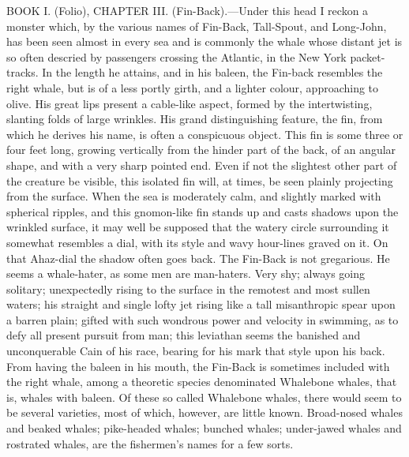 BOOK I. (Folio), CHAPTER III. (Fin-Back).—Under this head I reckon a monster which, by the various names of Fin-Back, Tall-Spout, and Long-John, has been seen almost in every sea and is commonly the whale whose distant jet is so often descried by passengers crossing the Atlantic, in the New York packet-tracks. In the length he attains, and in his baleen, the Fin-back resembles the right whale, but is of a less portly girth, and a lighter colour, approaching to olive. His great lips present a cable-like aspect, formed by the intertwisting, slanting folds of large wrinkles. His grand distinguishing feature, the fin, from which he derives his name, is often a conspicuous object. This fin is some three or four feet long, growing vertically from the hinder part of the back, of an angular shape, and with a very sharp pointed end. Even if not the slightest other part of the creature be visible, this isolated fin will, at times, be seen plainly projecting from the surface. When the sea is moderately calm, and slightly marked with spherical ripples, and this gnomon-like fin stands up and casts shadows upon the wrinkled surface, it may well be supposed that the watery circle surrounding it somewhat resembles a dial, with its style and wavy hour-lines graved on it. On that Ahaz-dial the shadow often goes back. The Fin-Back is not gregarious. He seems a whale-hater, as some men are man-haters. Very shy; always going solitary; unexpectedly rising to the surface in the remotest and most sullen waters; his straight and single lofty jet rising like a tall misanthropic spear upon a barren plain; gifted with such wondrous power and velocity in swimming, as to defy all present pursuit from man; this leviathan seems the banished and unconquerable Cain of his race, bearing for his mark that style upon his back. From having the baleen in his mouth, the Fin-Back is sometimes included with the right whale, among a theoretic species denominated Whalebone whales, that is, whales with baleen. Of these so called Whalebone whales, there would seem to be several varieties, most of which, however, are little known. Broad-nosed whales and beaked whales; pike-headed whales; bunched whales; under-jawed whales and rostrated whales, are the fishermen’s names for a few sorts.

